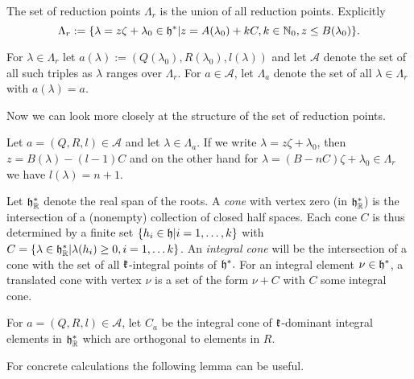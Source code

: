 \begin{definition}
 The set of reduction points $\Lambda_r$ is the union of all reduction points. Explicitly
 \[
 \Lambda_r := \{ \lambda = z\zeta + \lambda_0 \in \mathfrak{h}^* | z = A(\lambda_0) +kC, k\in\mathbb{N}_0, z \leq B(\lambda_0) \}.
 \]

 For $\lambda \in \Lambda_r$ let $a(\lambda) := (Q(\lambda_0),R(\lambda_0),l(\lambda))$ and let $\mathcal{A}$ denote the set of all such triples as $\lambda$ ranges over $\Lambda_r$. For $a\in\mathcal{A}$, let $\Lambda_a$ denote the set of all $\lambda\in\Lambda_r$ with $a(\lambda)=a$.
\end{definition}

Now we can look more closely at the structure of the set of reduction points. 

\begin{corollary}
 Let $a=(Q,R,l)\in\mathcal{A}$ and let $\lambda\in\Lambda_a$. If we write $\lambda= z\zeta + \lambda_0$, then $z=B(\lambda)-(l-1)C$ and on the other hand for $\lambda=(B - nC)\zeta + \lambda_0 \in \Lambda_r$ we have $l(\lambda) =n+1$.
\end{corollary}

Let $\mathfrak{h}^*_{\mathbb{R}}$ denote the real span of the roots. A \emph{cone} with vertex zero (in $\mathfrak{h}^*_{\mathbb{R}}$) is the intersection of a (nonempty) collection of closed half spaces. Each cone $C$ is thus determined by a finite set $\{h_i \in \mathfrak{h}|i=1,\ldots,k\}$ with $C= \{ \lambda \in \mathfrak{h}^*_{\mathbb{R}} | \lambda(h_i) \geq 0, i=1,\ldots k\}$. An \emph{integral cone} will be the intersection of a cone with the set of all $\mathfrak{k}$-integral points of $\mathfrak{h}^*.$ For an integral element $\nu\in\mathfrak{h}^*$, a translated cone with vertex $\nu$ is a set of the form $\nu + C$ with $C$ some integral cone.

\begin{definition}
 For $a=(Q,R,l)\in\mathcal{A}$, let $C_a$ be the integral cone of $\mathfrak{k}$-dominant integral elements in $\mathfrak{h}^*_{\mathbb{R}}$ which are orthogonal to elements in $R$.
\end{definition}


For concrete calculations the following lemma can be useful. 

